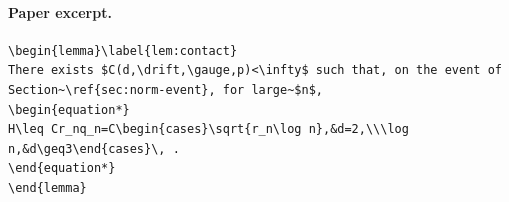 \paragraph{Paper excerpt.}
\begin{verbatim}
\begin{lemma}\label{lem:contact}
There exists $C(d,\drift,\gauge,p)<\infty$ such that, on the event of Section~\ref{sec:norm-event}, for large~$n$,
\begin{equation*}
H\leq Cr_nq_n=C\begin{cases}\sqrt{r_n\log n},&d=2,\\\log n,&d\geq3\end{cases}\, .
\end{equation*}
\end{lemma}
\end{verbatim}
